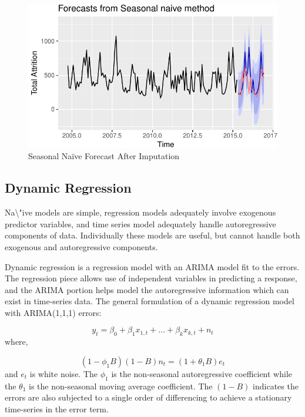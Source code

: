 \documentclass[12pt,letterpaper,toc=flat,oneside]{report}
\theoremstyle{definition}
\theoremstyle{definition}
\theoremstyle{definition}
\theoremstyle{remark}
\begin{document}
\begin{figure}[H]

{\centering \includegraphics{elliott-econometric-personnel-retention-18_files/figure-latex/sn-forecast-2-1} 

}

\caption{Seasonal Na\"ive Forecast After Imputation}\label{fig:sn-forecast-2}
\end{figure}

\hypertarget{dynamic-regression}{%
\subsection{Dynamic Regression}\label{dynamic-regression}}

Na\textbackslash{}"ive models are simple, regression models adequately
involve exogenous predictor variables, and time series model adequately
handle autoregressive components of data. Individually these models are
useful, but cannot handle both exogenous and autoregressive components.

Dynamic regression is a regression model with an ARIMA model fit to the
errors. The regression piece allows use of independent variables in
predicting a response, and the ARIMA portion helps model the
autoregressive information which can exist in time-series data. The
general formulation of a dynamic regression model with ARIMA(1,1,1)
errors:

\[ y_t = \beta_0 + \beta_1x_{1,t} + ... + \beta_kx_{k,t} + n_t\] where,

\[ (1-\phi_1B)(1-B)n_t = (1+\theta_1B)e_t \] and \(e_t\) is white noise.
The \(\phi_1\) is the non-seasonal autoregressive coefficient while the
\(\theta_1\) is the non-seasonal moving average coefficient. The
\((1-B)\) indicates the errors are also subjected to a single order of
differencing to achieve a stationary time-series in the error term.
\end{document}
